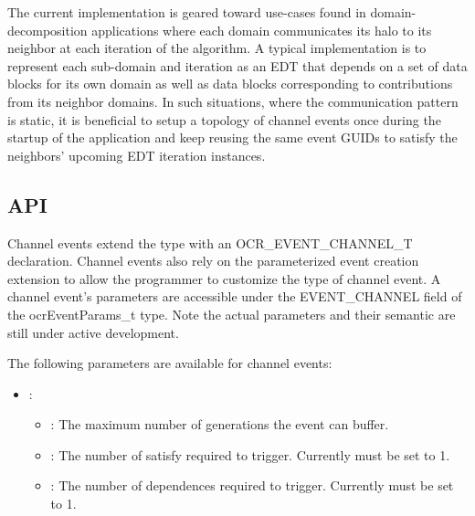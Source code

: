 The current implementation is geared toward use-cases found in
domain-decomposition applications where each domain communicates its
halo to its neighbor at each iteration of the algorithm. A typical
implementation is to represent each sub-domain and iteration as an EDT
that depends on a set of data blocks for its own domain as well as
data blocks corresponding to
contributions from its neighbor domains. In such situations, where the
communication pattern is static, it
is beneficial to setup a topology of channel events once during the
startup of the application and keep reusing the same event GUIDs to
satisfy the neighbors' upcoming EDT iteration instances.

\subsection{API}

Channel events extend the
\hyperlink{type_ocrEventTypes_t}{} type
with an OCR\_EVENT\_CHANNEL\_T declaration. Channel events also rely
on the parameterized event creation extension to allow the programmer
to customize the type of channel event. A channel event's parameters are
accessible under the EVENT\_CHANNEL field of the ocrEventParams\_t
type. Note the actual parameters and their semantic are still under
active development.

The following parameters are available for channel events:
\begin{itemize}
\item {}:
\begin{itemize}
\item {}: The maximum number of generations the event can buffer.
\item {}: The number of satisfy required to trigger.
  Currently must be set to 1.
\item {}: The number of dependences required to
  trigger. Currently must be set to 1.
\end{itemize}
\end{itemize}
